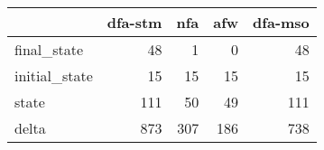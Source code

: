 \begin{tabular}{lrrrr}
\toprule
{} &  dfa-stm &  nfa &  afw &  dfa-mso \\
\midrule
final\_state   &       48 &    1 &    0 &       48 \\
initial\_state &       15 &   15 &   15 &       15 \\
state         &      111 &   50 &   49 &      111 \\
delta         &      873 &  307 &  186 &      738 \\
\bottomrule
\end{tabular}
